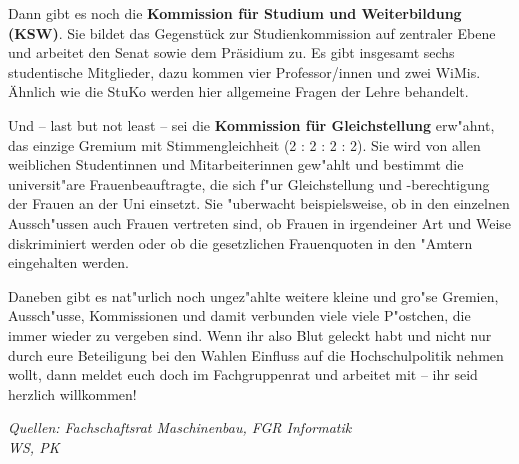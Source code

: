 Dann gibt es noch die \textbf{Kommission für Studium und Weiterbildung (KSW)}. 
Sie bildet das Gegenstück zur Studienkommission auf zentraler Ebene und arbeitet den Senat sowie dem 
Präsidium zu. Es gibt insgesamt sechs studentische Mitglieder, dazu kommen vier Professor/innen und zwei WiMis. 
Ähnlich wie die StuKo werden hier allgemeine Fragen der Lehre behandelt.

Und -- last but not least -- sei die \textbf{Kommission für Gleichstellung} 
erw"ahnt, das einzige Gremium mit Stimmengleichheit (2 : 2 : 2 : 2). Sie wird von allen 
weiblichen Studentinnen und Mitarbeiterinnen gew"ahlt und bestimmt 
 die universit"are Frauenbeauftragte, die sich f"ur Gleichstellung und 
-berechtigung der Frauen an der Uni einsetzt. Sie "uberwacht beispielsweise, ob 
in den einzelnen Aussch"ussen auch Frauen vertreten sind, ob Frauen in 
irgendeiner Art und Weise diskriminiert werden oder ob die gesetzlichen 
Frauenquoten in den "Amtern eingehalten werden. 

Daneben gibt es nat"urlich noch ungez"ahlte weitere kleine und gro"se Gremien, 
Aussch"usse, Kommissionen und damit verbunden viele viele P"ostchen, die immer 
wieder zu vergeben sind. Wenn ihr also Blut geleckt habt und nicht nur durch 
eure Beteiligung bei den Wahlen Einfluss auf die Hochschulpolitik nehmen wollt, 
dann meldet euch doch im Fachgruppenrat und arbeitet mit -- ihr seid herzlich 
willkommen!

\emph{Quellen: Fachschaftsrat Maschinenbau, FGR Informatik\\WS, PK}

